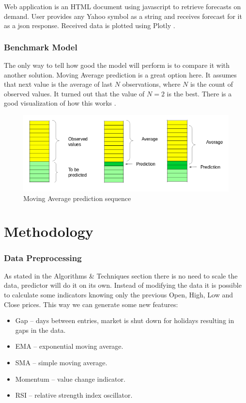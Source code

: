 \documentclass[a4paper,12pt]{article}
\begin{document}
Web application is an HTML document using javascript to retrieve forecasts on demand. User provides any Yahoo symbol as a string and receives forecast for it as a json response. Received data is plotted using Plotly \cite{Plotly}.

\section{Benchmark Model}
The only way to tell how good the model will perform is to compare it with another solution. Moving Average prediction is a great option here. It assumes that next value is the average of last $N$ observations, where $N$ is the count of observed values. It turned out that the value of $N = 2$ is the best. There is a good visualization of how this works \cite{Vidhya}.
\begin{figure}[h]
	\centering
	\includegraphics[scale=0.5]{ma}
	\caption{Moving Average prediction sequence \cite{Vidhya}}
\end{figure}


\part{Methodology}
\section{Data Preprocessing}
As stated in the Algorithms \& Techniques section there is no need to scale the data, predictor will do it on its own.
Instead of modifying the data it is possible to calculate some indicators knowing only the previous Open, High, Low and Close prices. This way we can generate some new features:
\begin{itemize}
	\item Gap -- days between entries, market is shut down for holidays resulting in gaps in the data.
	\item EMA -- exponential moving average.
	\item SMA -- simple moving average.
	\item Momentum -- value change indicator.
	\item RSI -- relative strength index oscillator.
\end{itemize}
\end{document}
